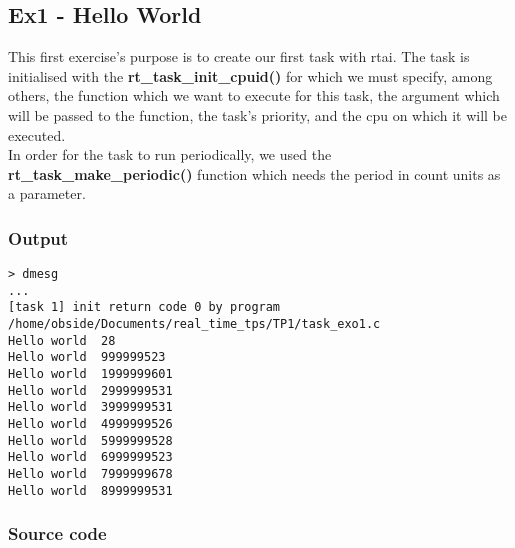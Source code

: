 \subsection{Ex1 - Hello World}
This first exercise's purpose is to create our first task with rtai. The task is initialised with the \textbf{rt\_task\_init\_cpuid()} for which we must specify, among others, the function which we want to execute for this task, the argument which will be passed to the function, the task's priority, and the cpu on which it will be executed.\\

In order for the task to run periodically, we used the \textbf{rt\_task\_make\_periodic()} function which needs the period in count units as a parameter.

\subsubsection{Output}
\begin{lstlisting}[keywordstyle=\color{black}]
> dmesg
...
[task 1] init return code 0 by program /home/obside/Documents/real_time_tps/TP1/task_exo1.c
Hello world  28
Hello world  999999523
Hello world  1999999601
Hello world  2999999531
Hello world  3999999531
Hello world  4999999526
Hello world  5999999528
Hello world  6999999523
Hello world  7999999678
Hello world  8999999531
\end{lstlisting}

\subsubsection{Source code}

